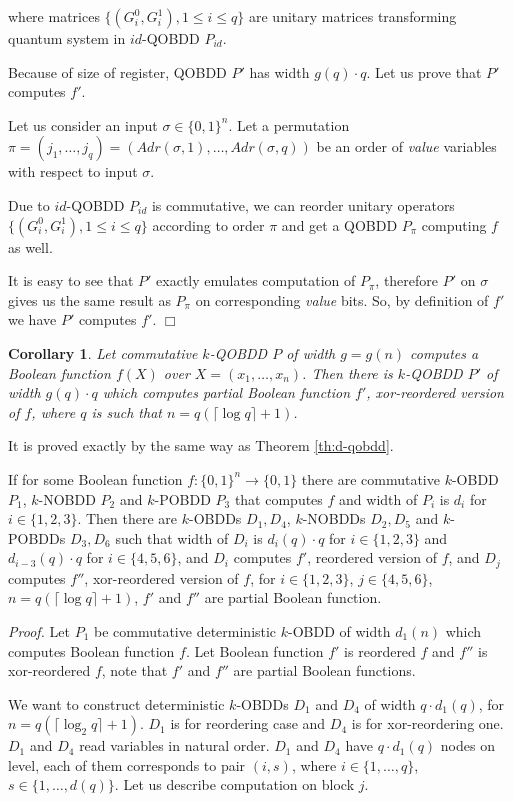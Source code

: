 \documentclass{llncs}
\newcommand{\Beginproof}{{\em Proof.}  }
\newcommand{\Endproof}{\hfill$\Box$\\}
\newtheorem{CR}[THM]{Corollary}
\begin{document}
where matrices $\{(G_i^0,G_i^1), 1\leq i \leq q\}$ are unitary matrices transforming quantum system in  $id$-QOBDD $P_{id}$. 

Because of size of register, QOBDD $P'$  has width $g(q) \cdot q$.  Let us prove that $P'$ computes $f'$.

Let us consider an input $\sigma\in\{0,1\}^n$.  Let a permutation $\pi = (j_1, \ldots, j_q)=(Adr(\sigma,1),\dots, Adr(\sigma,q))$ be an order of {\em value} variables with respect to input $\sigma$.   

Due to $id$-QOBDD $P_{id}$ is commutative, we can reorder unitary operators $\{(G_i^0,G_i^1), 1\leq i \leq q\}$ according to order $\pi$ and get a QOBDD $P_{\pi}$ computing $f$ as well.

It is easy to see that $P'$ exactly emulates computation of $P_{\pi}$, therefore $P'$ on $\sigma$ gives us the same result as $P_{\pi}$ on corresponding {\em value} bits. So, by definition of $f'$ we have $P'$ computes $f'$.
\Endproof
\begin{CR}
Let commutative $k$-QOBDD $P$ of width $g=g(n)$ computes a Boolean function $f(X)$ over  $X=(x_1, \ldots, x_n)$. Then there is $k$-QOBDD $P'$ of width $g(q) \cdot q$ which computes partial Boolean function $f'$, xor-reordered version of $f$, where $q$ is such that $n=q(\lceil\log q\rceil+1)$.
\end{CR}

It is proved exactly by the same way as Theorem \ref{th:d-qobdd}.

\begin{theorem}\label{th:deord-classic}
If for some Boolean function $f:\{0,1\}^n\to \{0,1\}$ there are commutative $k$-OBDD $P_1$, $k$-NOBDD $P_2$ and $k$-POBDD $P_3$ that computes $f$ and width of $P_i$ is $d_i$ for $i\in\{1,2,3\}$. 
%
Then there are $k$-OBDDs $D_1,D_4$, $k$-NOBDDs $D_2,D_5$  and $k$-POBDDs $D_3,D_6$ such that width of $D_i$ is $d_i(q)\cdot q$ for $i\in\{1,2,3\}$ and $d_{i-3}(q)\cdot q$ for $i\in\{4,5,6\}$, and $D_i$ computes  $f'$, reordered version of $f$, and $D_j$ computes $f''$, xor-reordered version of $f$, for $i\in\{1,2,3\}$, $j\in\{4,5,6\}$, $n=q(\lceil\log q\rceil+1)$, $f'$ and $f''$ are partial Boolean function.
\end{theorem}
\Beginproof 
Let $P_1$ be commutative deterministic $k$-OBDD of width $d_1(n)$ which computes Boolean function $f$. Let Boolean function $f'$ is  reordered $f$ and $f''$ is xor-reordered $f$, note that $f'$ and $f''$ are partial Boolean functions.

We want to construct deterministic $k$-OBDDs $D_1$ and $D_4$ of width $q\cdot d_1(q)$, for $n=q(\lceil \log_2  q \rceil+1)$. $D_1$ is for reordering case and $D_4$ is for xor-reordering one. $D_1$ and $D_4$  read variables in natural order. $D_1$ and $D_4$ have $q\cdot d_1(q)$ nodes on level, each of them corresponds to pair $(i,s)$, where $i\in\{1,\dots,q\}$, $s\in\{1,\dots, d(q)\}$. Let us describe computation on  block $j$. 
\end{document}
